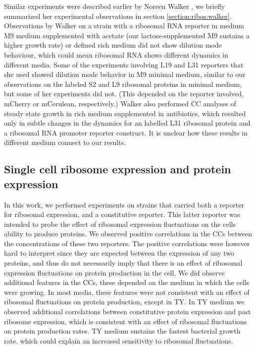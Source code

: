 Similar experiments were described earlier by Noreen Walker \cite{Walker2016t}, 
we briefly summarized her experimental observations in section \ref{section:ribos:walker}.
%
Observations by Walker on a strain with a ribosomal RNA reporter in medium M9 medium supplemented with acetate (our lactose-supplemented M9 sustains a higher growth rate) or defined rich medium did not show dilution mode behaviour, which could mean ribosomal RNA shows different dynamics in different media.
%
Some of the experiments involving L19 and L31 reporters that she used showed dilution mode behavior in M9 minimal medium, similar to our observations on the labeled S2 and L9 ribosomal proteins in minimal medium, but some of her experiments did not. (This depended on the reporter involved, mCherry or mCerulean, respectively.)
%
Walker also performed CC analyses of steady state growth in rich medium supplemented in antibiotics, which resulted only in subtle changes in the dynamics for an labelled L31 ribosomal protein and a ribosomal RNA promoter reporter construct.
It is unclear how these results in different medium connect to our results.

\subsection{Single cell ribosome expression and protein expression}

In this work, we performed experiments on strains that carried both a reporter for ribosomal expression, and a constitutive reporter.
This latter reporter was intended to probe the effect of ribosomal expression fluctuations on the cells ability to produce proteins.
%
We observed positive correlations in the CCs between the concentrations of these two reporters. 
%
The positive correlations were however hard to interpret since 
%
they are expected between the expression of any two proteins, 
and thus do not necessarily imply that there is an effect of ribosomal expression fluctuations on protein production in the cell.
%
We did observe additional features in the CCs, 
these depended on the medium in which the cells were growing.
%
In most media, these features were not consistent with an effect of ribosomal fluctuations on protein production,
except in TY.
%
In TY medium we observed additional correlations between constitutive protein expression and past ribosome expression,
which is consistent with an effect of ribosomal fluctuations on protein production rates.
%
TY medium sustains the fastest bacterial growth rate, 
which could explain an increased sensitivity to ribosomal fluctuations.


